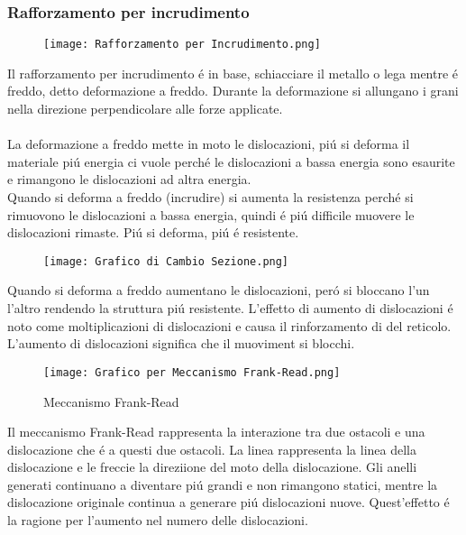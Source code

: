 \documentclass{article}
\begin{document}
            \subsubsection{Rafforzamento per incrudimento}
                \begin{figure}
                    \centering
                    \texttt{[image: Rafforzamento per Incrudimento.png]}
                \end{figure}
                Il rafforzamento per incrudimento \'e in base, schiacciare il metallo o lega mentre \'e freddo, detto deformazione a freddo. Durante la deformazione si allungano i grani nella direzione perpendicolare alle forze applicate.\\ \\
                La deformazione a freddo mette in moto le dislocazioni, pi\'u si deforma il materiale pi\'u energia ci vuole perch\'e le dislocazioni a bassa energia sono esaurite e rimangono le dislocazioni ad altra energia.\\
                Quando si deforma a freddo (incrudire) si aumenta la resistenza perch\'e si rimuovono le dislocazioni a bassa energia, quindi \'e pi\'u difficile muovere le dislocazioni rimaste. Pi\'u si deforma, pi\'u \'e resistente.\\ \newpage
                \begin{figure}[ht]
                    \centering
                    \texttt{[image: Grafico di Cambio Sezione.png]}
                \end{figure}
                Quando si deforma a freddo aumentano le dislocazioni, per\'o si bloccano l'un l'altro rendendo la struttura pi\'u resistente. L'effetto di aumento di dislocazioni \'e noto come moltiplicazioni di dislocazioni e causa il rinforzamento di del reticolo.\\
                L'aumento di dislocazioni significa che il muoviment si blocchi.
                \begin{figure}[!h]
                    \centering
                    \texttt{[image: Grafico per Meccanismo Frank-Read.png]}
                    \caption{Meccanismo Frank-Read}
                \end{figure}
                Il meccanismo Frank-Read rappresenta la interazione tra due ostacoli e una dislocazione che \'e a questi due ostacoli. La linea rappresenta la linea della dislocazione e le freccie la direziione del moto della dislocazione. Gli anelli generati continuano a diventare pi\'u grandi e non rimangono statici, mentre la dislocazione originale continua a generare pi\'u dislocazioni nuove. Quest'effetto \'e la ragione per l'aumento nel numero delle dislocazioni.
\end{document}
